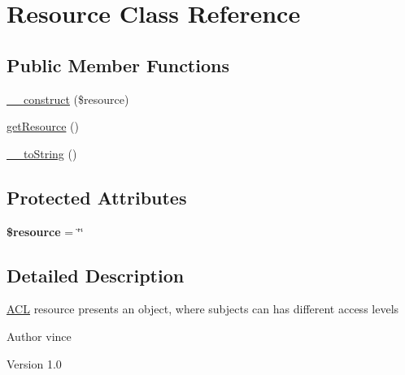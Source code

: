 \hypertarget{class_anemo_1_1_a_c_l_1_1_resource}{
\section{Resource Class Reference}
\label{class_anemo_1_1_a_c_l_1_1_resource}
}
\subsection*{Public Member Functions}
\begin{DoxyCompactItemize}
\item 
\hyperlink{class_anemo_1_1_a_c_l_1_1_resource_a95823eae5a5d263f5c3b62fcc745defd}{\_\-\_\-construct} (\$resource)
\item 
\hyperlink{class_anemo_1_1_a_c_l_1_1_resource_a8c5a689e9be7d35d0d01d0194637a7d2}{getResource} ()
\item 
\hyperlink{class_anemo_1_1_a_c_l_1_1_resource_a7516ca30af0db3cdbf9a7739b48ce91d}{\_\-\_\-toString} ()
\end{DoxyCompactItemize}
\subsection*{Protected Attributes}
\begin{DoxyCompactItemize}
\item 
\hypertarget{class_anemo_1_1_a_c_l_1_1_resource_abd4c7b8b084214b8d2533ba07fce6b83}{
{\bfseries \$resource} = \char`\"{}\char`\"{}}
\label{class_anemo_1_1_a_c_l_1_1_resource_abd4c7b8b084214b8d2533ba07fce6b83}

\end{DoxyCompactItemize}


\subsection{Detailed Description}
\hyperlink{class_anemo_1_1_a_c_l}{ACL} resource presents an object, where subjects can has different access levels \begin{DoxyAuthor}{Author}
vince 
\end{DoxyAuthor}
\begin{DoxyVersion}{Version}
1.0 
\end{DoxyVersion}


